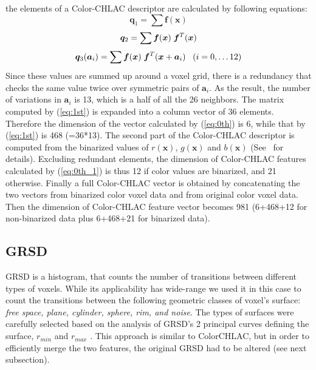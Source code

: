 \documentclass[conference]{sty/IEEEtran}
\begin{document}
the elements of a Color-CHLAC descriptor are calculated by following equations:
\begin{equation}\label{eq:0th}
  {\bm q_1} = \sum \bm{f}({\bm x})
\end{equation}
\begin{equation}\label{eq:0th_1}
  {\bm q_2} = \sum \bm{f}({\bm x}) \hspace{1mm}\bm{f}^T({\bm x}) \\
\end{equation}
\begin{equation}\label{eq:1st}
  {\bm q_3}({\bm a}_i) = \sum \bm{f}({\bm x}) \hspace{1mm}\bm{f}^T({\bm x}+{\bm a_i}) \;\;\; (i=0, \dots 12) \\
\end{equation}
%
Since these values are summed up around a voxel grid, there is a redundancy that checks 
the same value twice over symmetric pairs of ${\bm a_i}$. 
As the result, the number of variations in ${\bm a_i}$ is 13, which is a half of all the 26 neighbors.
The matrix computed by (\ref{eq:1st}) is expanded into a column vector of 36 elements.
Therefore the dimension of the vector calculated by (\ref{eq:0th}) is 6, while that by 
(\ref{eq:1st}) is 468 (=36*13).
The second part of the Color-CHLAC descriptor is computed from the binarized values of $r(\bm{x})$, $g(\bm{x})$ 
and $b(\bm{x})$ (See~\cite{kanezaki2010icra} for details). 
Excluding redundant elements, the dimension of Color-CHLAC features calculated by (\ref{eq:0th_1}) 
is thus 12 if color values are binarized, and 21 otherwise. 
Finally a full Color-CHLAC vector is obtained by concatenating the two vectors from binarized 
color voxel data and from original color voxel data. Then the dimension of Color-CHLAC feature vector 
becomes 981 (6+468+12 for non-binarized data plus 6+468+21 for binarized data). 

\subsection{GRSD}
\label{sec:grsd}
GRSD is a histogram, that counts the number of transitions between different types of voxels.
While its applicability has wide-range we used it in this case to count the transitions between 
the following geometric classes of voxel's surface: \emph{free space, plane, cylinder, sphere, rim, and noise}.
The types of surfaces were carefully selected based on the analysis of GRSD's   
2 principal curves defining the surface, $r_{min}$ and $r_{max}$ \cite{Marton10IROS}.
This approach is similar to ColorCHLAC, but in order to efficiently merge the two features, 
the original GRSD had to be altered (see next subsection). 
\end{document}
